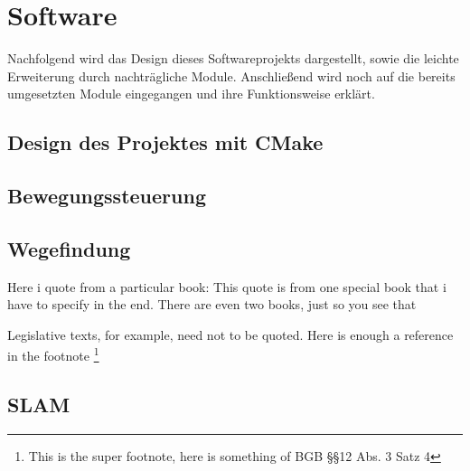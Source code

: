 \chapter{Software}
Nachfolgend wird das Design dieses Softwareprojekts dargestellt, sowie die leichte Erweiterung durch nachträgliche Module. Anschließend wird noch auf die bereits umgesetzten Module eingegangen und ihre Funktionsweise erklärt. 


\section{Design des Projektes mit CMake}

\section{Bewegungssteuerung}


\section{Wegefindung}

Here i quote from a particular book: This quote is from one special book that i have to specify in the end. There are even two books, just so you see that \cite{Williams201205,Siegert200612}


Legislative texts, for example, need not to be quoted. Here is enough a reference in the footnote \footnote{This is the super footnote, here is something of BGB §§12 Abs. 3 Satz 4}


\section{SLAM}